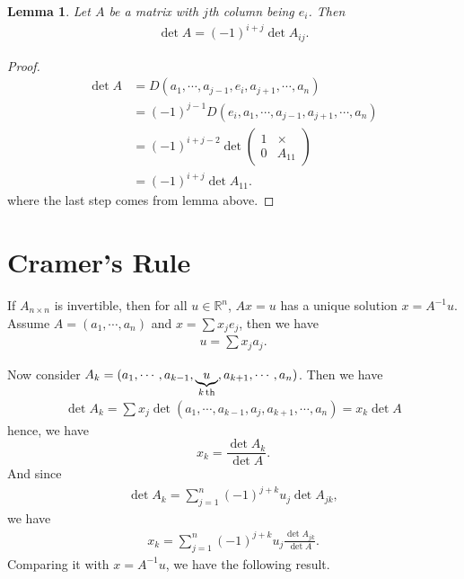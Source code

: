 \documentclass[10pt]{book}
\newtheorem{lemma}[theorem]{Lemma}
\theoremstyle{definition}
\numberwithin{equation}{chapter}
\begin{document}
\begin{lemma}
Let $A$ be a matrix with $j$th column being $e_i$. Then 
\begin{align*}
    \det A = (-1)^{i+j} \det A_{ij}.
\end{align*}
\end{lemma}
\begin{proof}
\begin{align*}
    \det A & = D(a_1,\cdots,a_{j-1}, e_i, a_{j+1}, \cdots, a_n) \\
    & = (-1)^{j-1} D(e_i, a_1,\cdots,a_{j-1}, a_{j+1}, \cdots, a_n) \\
    & = (-1)^{i+j-2} \det \left(
    \begin{matrix}
        1 & \times\\
        0 & A_{11}
    \end{matrix}
    \right) \\
    & = (-1)^{i+j} \det A_{11}.
\end{align*}
where the last step comes from lemma above. 
\end{proof}

\medskip

\section{Cramer's Rule}

If $A_{n\times n}$ is invertible, then for all $u\in\mathbb{R}^n$, $Ax = u$ has a unique solution $x = A^{-1}u$. Assume $A = (a_1, \cdots, a_n)$ and $x = \sum x_j e_j$, then we have 
\begin{align*}
    u = \sum x_j a_j.
\end{align*}

Now consider $A_k = (a_1, \cdots, a_{k-1}, \underbrace{u}_{k\,{\rm th}}, a_{k+1}, \cdots, a_n)$. Then we have 
\begin{align*}
    \det A_k = \sum x_j \det (a_1, \cdots, a_{k-1}, a_j, a_{k+1}, \cdots, a_n) = x_k \det A
\end{align*}
hence, we have
$$x_k = \frac{\det A_k}{\det A}.$$
And since 
\begin{align*}
    \det A_k = \sum^n_{j=1} (-1)^{j+k} u_j \det A_{jk},
\end{align*}
we have 
\begin{align*}
    x_k = \sum^n_{j=1} (-1)^{j+k} u_j \frac{\det A_{jk}}{\det A}.
\end{align*}
Comparing it with $x = A^{-1} u$, we have the following result.

\medskip
\end{document}
